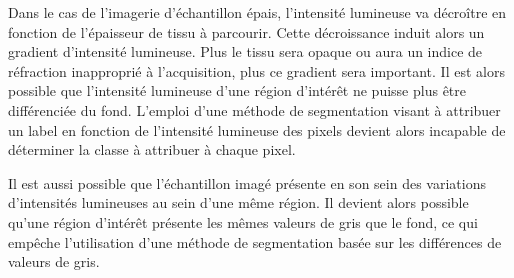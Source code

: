\documentclass[\main/main.tex]{subfiles}
\begin{document}
%
Dans le cas de l'imagerie d'échantillon épais, l'intensité lumineuse va décroître en fonction de l'épaisseur de tissu à parcourir.
%
Cette décroissance induit alors un gradient d'intensité lumineuse.
%
Plus le tissu sera opaque ou aura un indice de réfraction inapproprié à l'acquisition, plus ce gradient sera important.
%
Il est alors possible que l'intensité lumineuse d'une région d'intérêt ne puisse plus être différenciée du fond.
%
L'emploi d'une méthode de segmentation visant à attribuer un label en fonction de l'intensité lumineuse des pixels devient alors incapable de déterminer la classe à attribuer à chaque pixel.

%
Il est aussi possible que l'échantillon imagé présente en son sein des variations d'intensités lumineuses au sein d'une même région.
%
Il devient alors possible qu'une région d'intérêt présente les mêmes valeurs de gris que le fond, ce qui empêche l'utilisation d'une méthode de segmentation basée sur les différences de valeurs de gris.
\end{document}
